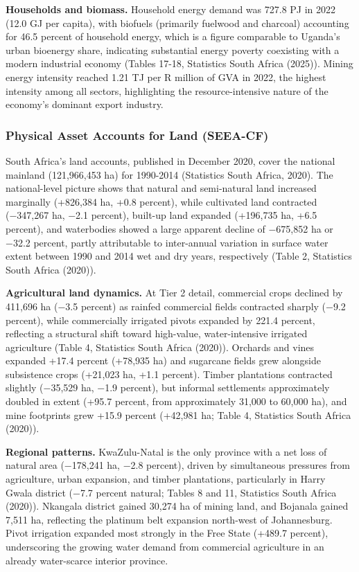 \documentclass[
  letterpaper,
  DIV=11,
  numbers=noendperiod]{scrartcl}
\begin{document}
\textbf{Households and biomass.} Household energy demand was 727.8 PJ in
2022 (12.0 GJ per capita), with biofuels (primarily fuelwood and
charcoal) accounting for 46.5 percent of household energy, which is a
figure comparable to Uganda's urban bioenergy share, indicating
substantial energy poverty coexisting with a modern industrial economy
(Tables 17-18, Statistics South Africa (2025)). Mining energy intensity
reached 1.21 TJ per R million of GVA in 2022, the highest intensity
among all sectors, highlighting the resource-intensive nature of the
economy's dominant export industry.

\subsubsection{Physical Asset Accounts for Land
(SEEA-CF)}\label{physical-asset-accounts-for-land-seea-cf-1}

South Africa's land accounts, published in December 2020, cover the
national mainland (121,966,453 ha) for 1990-2014 (Statistics South
Africa, 2020). The national-level picture shows that natural and
semi-natural land increased marginally (+826,384 ha, +0.8 percent),
while cultivated land contracted (−347,267 ha, −2.1 percent), built-up
land expanded (+196,735 ha, +6.5 percent), and waterbodies showed a
large apparent decline of −675,852 ha or −32.2 percent, partly
attributable to inter-annual variation in surface water extent between
1990 and 2014 wet and dry years, respectively (Table 2, Statistics South
Africa (2020)).

\textbf{Agricultural land dynamics.} At Tier 2 detail, commercial crops
declined by 411,696 ha (−3.5 percent) as rainfed commercial fields
contracted sharply (−9.2 percent), while commercially irrigated pivots
expanded by 221.4 percent, reflecting a structural shift toward
high-value, water-intensive irrigated agriculture (Table 4, Statistics
South Africa (2020)). Orchards and vines expanded +17.4 percent (+78,935
ha) and sugarcane fields grew alongside subsistence crops (+21,023 ha,
+1.1 percent). Timber plantations contracted slightly (−35,529 ha, −1.9
percent), but informal settlements approximately doubled in extent
(+95.7 percent, from approximately 31,000 to 60,000 ha), and mine
footprints grew +15.9 percent (+42,981 ha; Table 4, Statistics South
Africa (2020)).

\textbf{Regional patterns.} KwaZulu-Natal is the only province with a
net loss of natural area (−178,241 ha, −2.8 percent), driven by
simultaneous pressures from agriculture, urban expansion, and timber
plantations, particularly in Harry Gwala district (−7.7 percent natural;
Tables 8 and 11, Statistics South Africa (2020)). Nkangala district
gained 30,274 ha of mining land, and Bojanala gained 7,511 ha,
reflecting the platinum belt expansion north-west of Johannesburg. Pivot
irrigation expanded most strongly in the Free State (+489.7 percent),
underscoring the growing water demand from commercial agriculture in an
already water-scarce interior province.
\end{document}
